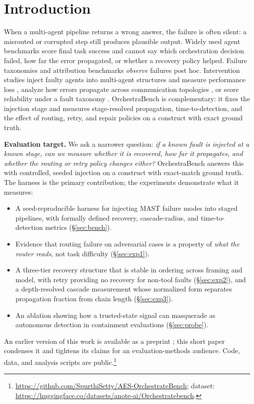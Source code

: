\documentclass[11pt,a4paper]{article}
\begin{document}
\section{Introduction}
\label{sec:intro}
When a multi-agent pipeline returns a wrong answer, the failure is often
silent: a misrouted or corrupted step still produces plausible output. Widely
used agent benchmarks \citep{agentbench,swebench,odysseybench} score final task
success and cannot say which orchestration decision failed, how far the error
propagated, or whether a recovery policy helped. Failure taxonomies
\citep{mast} and attribution benchmarks \citep{traceelephant,attribution}
\emph{observe} failures post hoc. Intervention studies inject faulty agents
into multi-agent structures and measure performance loss \citep{huang2025resilience},
analyze how errors propagate across communication topologies
\citep{shen2025propagation}, or score reliability under a fault taxonomy
\citep{masfire}. OrchestraBench is complementary: it fixes the injection stage
and measures stage-resolved propagation, time-to-detection, and the effect of
routing, retry, and repair policies on a construct with exact ground truth.

\textbf{Evaluation target.} We ask a narrower question: \emph{if a known fault is injected at a
known stage, can we measure whether it is recovered, how far it propagates, and
whether the routing or retry policy changes either?} OrchestraBench answers this
with controlled, seeded injection on a construct with exact-match ground truth.
The harness is the primary contribution; the experiments demonstrate what
it measures:
\begin{itemize}
  \item A seed-reproducible harness for injecting MAST failure modes into staged
  pipelines, with formally defined recovery, cascade-radius, and
  time-to-detection metrics (\S\ref{sec:bench}).
  \item Evidence that routing failure on adversarial cases is a property of
  \emph{what the router reads}, not task difficulty (\S\ref{sec:exp1}).
  \item A three-tier recovery structure that is stable in ordering across
  framing and model, with retry providing no recovery for non-tool faults
  (\S\ref{sec:exp2}), and a depth-resolved cascade measurement whose
  normalized form separates propagation fraction from chain length
  (\S\ref{sec:exp3}).
  \item An ablation showing how a trusted-state signal can masquerade as
  autonomous detection in containment evaluations (\S\ref{sec:probe}).
\end{itemize}
An earlier version of this work is available as a preprint
\citep{chen2026orchestrabench}; this short paper condenses it and tightens its
claims for an evaluation-methods audience. Code, data, and analysis scripts
are public.\footnote{\url{https://github.com/SpurthiSetty/AES-OrchestrateBench};
dataset: \url{https://huggingface.co/datasets/anote-ai/Orchestratebench}.}
\end{document}
